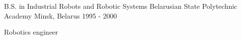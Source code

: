 

\begin{cventries}

  \cventry
    {B.S. in Industrial Robots and Robotic Systems} %
    {Belarusian State Polytechnic Academy} %
    {Minsk, Belarus} %
    {1995 - 2000} %
    {
      \begin{cvitems} %
        \item {Robotics engineer}
      \end{cvitems}
    }

\end{cventries}
